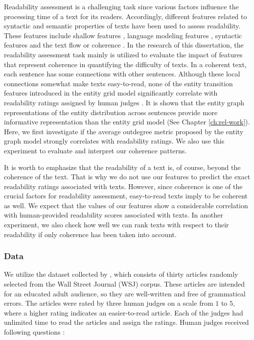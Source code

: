 Readability assessment is a challenging task since various factors influence the processing time of a text for its readers.
Accordingly, different features related to syntactic and semantic properties of texts have been used to assess readability. 
These features include shallow features \cite{flesch48,kincaid75}, language modeling features \cite{siluo01,collins-thompson04}, syntactic features \cite{schwarm05} and the text flow or coherence \cite{barzilay08,pitler08}. 
In the research of this dissertation, the readability assessment task mainly is utilized to evaluate the impact of features that represent coherence in quantifying the difficulty of texts.  
In a coherent text, each sentence has some connections with other sentences. 
Although these local connections somewhat make texts easy-to-read, none of the entity transition features introduced in the entity grid model \cite{barzilay08} significantly correlate with readability ratings assigned by human judges \cite{pitler08}.  
It is shown that the entity graph representations of the entity distribution across sentences provide more informative representation than the entity grid model (See Chapter \ref{ch:rel-work}).  
Here, we first investigate if the average outdegree metric proposed by the entity graph model strongly correlates with readability ratings. 
We also use this experiment to evaluate and interpret our coherence patterns. 

It is worth to emphasize that the readability of a text is, of course, beyond the coherence of the text. 
That is why we do not use our features to predict the exact readability ratings associated with texts. 
However, since coherence is one of the crucial factors for readability assessment, easy-to-read texts imply to be coherent as well. 
We expect that the values of our features show a considerable correlation with human-provided readability scores associated with texts. 
In another experiment, we also check how well we can rank texts with respect to their readability if only coherence has been taken into account. 


\subsubsection{Data}
\label{sec:data_pitler}

We utilize the dataset collected by , which consists of thirty articles randomly selected from the Wall Street Journal (WSJ) corpus. 
These articles are intended for an educated adult audience, so they are well-written and free of grammatical errors. 
The articles were rated by three human judges on a scale from $1$ to $5$, where a higher rating indicates an easier-to-read article. 
Each of the judges had unlimited time to read the articles and assign the ratings. 
Human judges received following questions \cite{pitler08}:

